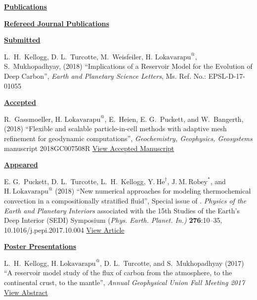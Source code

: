 \documentclass[11pt]{ltxdoc}
\begin{document}
\clearpage

\newpage

\begin{center}
  \textbf{\underline{Publications}}
\end{center}

\noindent
\textbf{\underline{Refereed Journal Publications}}


\noindent
\textbf{\underline{Submitted}}


\hangindent 20pt
L.~H.~Kellogg, D. L.~Turcotte, M.~Weisfeiler, $\textrm{H.~Lokavarapu}^@$, S.~Mukhopadhyay, (2018) 
``Implications of a Reservoir Model for the
Evolution of Deep Carbon'', 
\textit{Earth and Planetary Science Letters}, Ms. Ref. No.:  EPSL-D-17-01055


\noindent
\textbf{\underline{Accepted}}

\hangindent 20pt
R.~Gassmoeller,  $\textrm{H.~Lokavarapu}^@$, E.~Heien, E. G.~Puckett, and W.~Bangerth, (2018) 
``Flexible and scalable particle-in-cell methods with adaptive mesh refinement for geodynamic computations'', 
\textit{Geochemistry, Geophysics, Geosystems} manuscript 2018GC007508R 
\href{https://www.math.ucdavis.edu/~egp/PUBLICATIONS/JOURNAL_ARTICLES/ACCEPTED/RG-HL-EH-EGP-WB-2018.pdf}{View Accepted Manuscript}

\noindent
\textbf{\underline{Appeared}}

\vskip 06pt


\hangindent 20pt
E. G.~Puckett, D. L.~Turcotte, L.~H.~Kellogg,  $\mathrm{Y.~He}^{\dagger}$, $\mathrm{J.~M.~Robey}^{*}$, and 
$\mathrm{H.~Lokavarapu}^{@}$ (2018)
``New numerical approaches for modeling thermochemical convection in a compositionally stratified fluid'', 
Special issue of . \textit{Physics of the Earth and Planetary Interiors} associated with the 15th Studies of the Earth's Deep Interior (SEDI) Symposium (\textit{Phys. Earth. Planet. In.)} \textbf{276}:10–35, 10.1016/j.pepi.2017.10.004
\href{https://www.math.ucdavis.edu/~egp/PUBLICATIONS/JOURNAL_ARTICLES/APPEARED/2018/EGP-DLT-YH-HL-JMR-LHK-2018.pdf}{View Article}

\noindent
\textbf{\underline{Poster Presentations}}


\hangindent 20pt
L.~H.~Kellogg, $\mathrm{H.~Lokavarapu}^{@}$, D. L.~Turcotte, and S.~Mukhopadhyay (2017) 
``A reservoir model study of the flux of carbon from the atmosphere, to the continental crust, to the mantle'', 
\textit{Annual Geophysical Union Fall Meeting 2017}
\href{http://adsabs.harvard.edu/abs/2017AGUFMDI14A..06K}{View Abstract}
\end{document}
